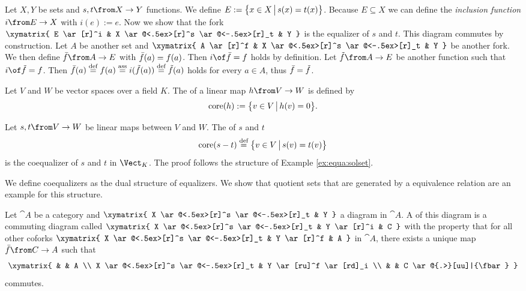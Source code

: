 \begin{example}
  \label{ex:equa:solset}
  Let $X, Y$ be sets and $s, t \from X \to Y$ functions.
  We define $E := \bigl \{ x \in X \,\big|\, s(x)=t(x) \bigr \}$.
  Because $E \subseteq X$ we can define the \emph{inclusion function} $i \from E \to X$ with $i(e) := e$.
  Now we show that the fork
  $ \xymatrix{
    E \ar[r]^i & X \ar@<.5ex>[r]^s \ar@<-.5ex>[r]_t & Y
  } $
  is the equalizer of $s$ and $t$. This diagram commutes by construction.
  Let $A$ be another set and
  $ \xymatrix{
    A \ar[r]^f & X \ar@<.5ex>[r]^s \ar@<-.5ex>[r]_t & Y
  } $
  be another fork.
  We then define $\fbar \from A \to E$ with $\bar{f}(a) = f(a)$.
  Then $i \of \fbar = f$ holds by definition.
  Let $\ftilde \from A \to E$ be another function such that $i \of \ftilde = f$.
  Then $\bar{f}(a) \stackrel{\text{def}}{=} f(a) \stackrel{\text{ass}}{=} i(\tilde{f}(a)) \stackrel{\text{def}}{=} \tilde{f}(a)$ holds for every $a \in A$, thus $\bar{f} = \tilde{f}$.
\end{example}

\begin{example}
  \label{ex:equa:core}
  Let $V$ and $W$ be vector spaces over a field $K$.
  The  of a linear map $h \from V \to W$ is defined by $$\operatorname{core}(h) := \bigl \{ v \in V \,\big|\, h(v) = 0 \bigr \}.$$

  Let $s, t \from V \to W$ be linear maps between $V$ and $W$.
  The  of $s$ and $t$ $$\operatorname{core}(s - t) \stackrel{\text{def}}{=} \bigl \{ v \in V \,\big|\, s(v) = t(v) \bigr \}$$ is the coequalizer of $s$ and $t$ in $\Vect_K$.
  The proof follows the structure of Example \ref{ex:equa:solset}.
\end{example}

We define coequalizers as the dual structure of equalizers.
We show that quotient sets that are generated by a equivalence relation are an example for this structure.

\begin{definition}[Coequalizer]
  \label{def:coequa}
  Let $\cat{A}$ be a category and
  $ \xymatrix{
    X \ar@<.5ex>[r]^s \ar@<-.5ex>[r]_t & Y
  } $
  a diagram in $\cat{A}$.
  A  of this diagram is a commuting diagram called 
  $ \xymatrix{
    X \ar@<.5ex>[r]^s \ar@<-.5ex>[r]_t & Y \ar[r]^i & C
  } $
  with the property that for all other coforks
  $ \xymatrix{
    X \ar@<.5ex>[r]^s \ar@<-.5ex>[r]_t & Y \ar[r]^f & A
  } $
  in $\cat{A}$, there exists a unique map $\fbar\from C \to A$ such that
  \[ \xymatrix{
    & & A  \\
    X \ar@<.5ex>[r]^s \ar@<-.5ex>[r]_t & Y \ar[ru]^f \ar[rd]_i \\
    & & C \ar@{.>}[uu]|{\fbar}
  } \]
  commutes.
\end{definition}

